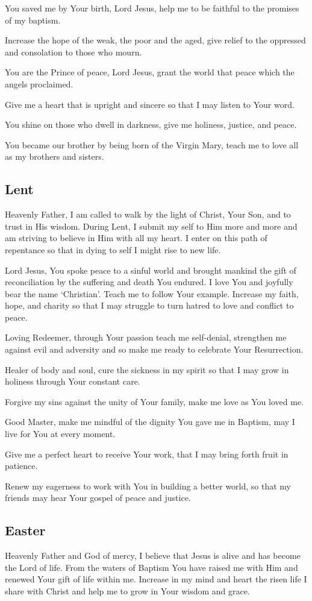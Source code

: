 \documentclass[12pt]{article}
\newcommand{\prayertitle}[1]{\subsection{#1}}
\begin{document}
You saved me by Your birth, Lord Jesus, help me to be faithful to the promises of my baptism.

Increase the hope of the weak, the poor and the aged, give relief to the oppressed and consolation to those who mourn.

You are the Prince of peace, Lord Jesus, grant the world that peace which the angels proclaimed.

Give me a heart that is upright and sincere so that I may listen to Your word.

You shine on those who dwell in darkness, give me holiness, justice, and peace.

You became our brother by being born of the Virgin Mary, teach me to love all as my brothers and sisters.

\prayertitle{Lent}
Heavenly Father, I am called to walk by the light of Christ, Your Son, and to trust in His wisdom.
During Lent, I submit my self to Him more and more and am striving to believe in Him with all my heart.
I enter on this path of repentance so that in dying to self I might rise to new life.

Lord Jesus, You spoke peace to a sinful world and brought mankind the gift of reconciliation by the suffering and death You endured.
I love You and joyfully bear the name `Christian'.
Teach me to follow Your example.
Increase my faith, hope, and charity so that I may struggle to turn hatred to love and conflict to peace.

Loving Redeemer, through Your passion teach me self-denial, strengthen me against evil and adversity and so make me ready to celebrate Your Resurrection.

Healer of body and soul, cure the sickness in my spirit so that I may grow in holiness through Your constant care.

Forgive my sins against the unity of Your family, make me love as You loved me.

Good Master, make me mindful of the dignity You gave me in Baptism, may I live for You at every moment.

Give me a perfect heart to receive Your work, that I may bring forth fruit in patience.

Renew my eagerness to work with You in building a better world, so that my friends may hear Your gospel of peace and justice.

\prayertitle{Easter}
Heavenly Father and God of mercy, I believe that Jesus is alive and has become the Lord of life.
From the waters of Baptism You have raised me with Him and renewed Your gift of life within me.
Increase in my mind and heart the risen life I share with Christ and help me to grow in Your wisdom and grace.
\end{document}
